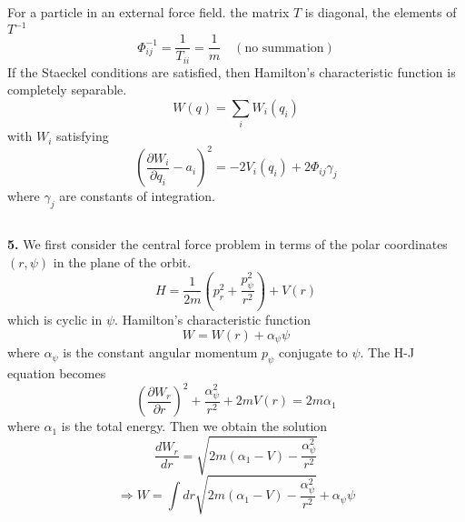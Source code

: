 \documentclass{article}
\begin{document}
	For a particle in an external force field.
	the matrix $T$ is diagonal, the elements of $T^{-1}$
	\begin{equation*}
		\Phi_{ij}^{-1} = \frac{1}{T_{ii}} = \frac{1}{m} \quad (\text{no summation})
	\end{equation*}
	If the Staeckel conditions are satisfied, then Hamilton's characteristic function is completely separable.
	\begin{equation*}
		W(q) = \sum_i W_i(q_i)
	\end{equation*}
	with $W_i$ satisfying
	\begin{equation*}
		\left(\frac{\partial W_i}{\partial q_i} - a_i\right)^2 = -2V_i(q_i) + 2\Phi_{ij} \gamma_j
	\end{equation*}
	where $\gamma_j$ are constants of integration.
	
	\subsection*{}
	\textbf{5.} We first consider the central force problem in terms of the polar coordinates $(r, \psi)$ in the plane of the orbit.
	\begin{equation*}
		H = \frac{1}{2m} (p_r^2 + \frac{p_\psi^2}{r^2}) + V(r)
	\end{equation*}
	which is cyclic in $\psi$.
	Hamilton's characteristic function
	\begin{equation*}
		W = W(r) + \alpha_\psi \psi
	\end{equation*}
	where $\alpha_\psi$ is the constant angular momentum $p_\psi$ conjugate to $\psi$.
	The H-J equation becomes
	\begin{equation*}
		\left(\frac{\partial W_r}{\partial r}\right)^2 + \frac{\alpha_\psi^2}{r^2} + 2m V(r) = 2m\alpha_1
	\end{equation*}
	where $\alpha_1$ is the total energy.
	Then we obtain the solution
	\begin{equation*}
		\frac{dW_r}{dr} = \sqrt{2m(\alpha_1 - V) - \frac{\alpha_\psi^2}{r^2}}
	\end{equation*}
	\begin{equation*}
		\Rightarrow W = \int dr \sqrt{2m(\alpha_1 - V) - \frac{\alpha_\psi^2}{r^2}} + \alpha_\psi \psi
	\end{equation*}
\end{document}
